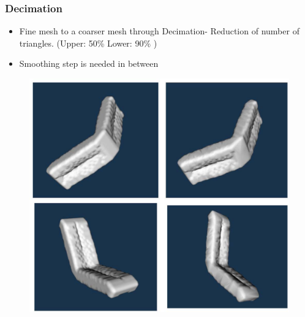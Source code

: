 \begin{frame}

	\frametitle{Decimation}
	\begin{minipage}{0.85\textwidth}
	\begin{itemize}
	\item Fine mesh to a coarser mesh through Decimation- Reduction of number of triangles. (Upper: 50\% Lower: 90\% )
	\end{itemize}

	\begin{itemize}
	\item Smoothing step is needed in between
	\end{itemize}

	\begin{figure}
	\includegraphics[scale=0.34]{Pictures/Decimation.pdf}


\end{figure}
\end{minipage}
\end{frame}
